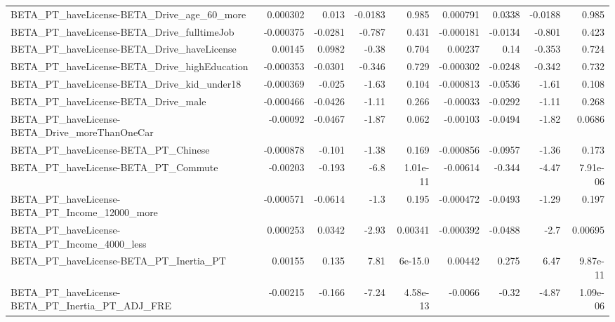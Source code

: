 \begin{tabular}{lrrrrrrrr}
BETA\_PT\_haveLicense-BETA\_Drive\_age\_60\_more         &    0.000302 &        0.013 &  -0.0183 &    0.985 &   0.000791 &      0.0338 &      -0.0188 &         0.985 \\
BETA\_PT\_haveLicense-BETA\_Drive\_fulltimeJob         &   -0.000375 &      -0.0281 &   -0.787 &    0.431 &  -0.000181 &     -0.0134 &       -0.801 &         0.423 \\
BETA\_PT\_haveLicense-BETA\_Drive\_haveLicense         &     0.00145 &       0.0982 &    -0.38 &    0.704 &    0.00237 &        0.14 &       -0.353 &         0.724 \\
BETA\_PT\_haveLicense-BETA\_Drive\_highEducation       &   -0.000353 &      -0.0301 &   -0.346 &    0.729 &  -0.000302 &     -0.0248 &       -0.342 &         0.732 \\
BETA\_PT\_haveLicense-BETA\_Drive\_kid\_under18         &   -0.000369 &       -0.025 &    -1.63 &    0.104 &  -0.000813 &     -0.0536 &        -1.61 &         0.108 \\
BETA\_PT\_haveLicense-BETA\_Drive\_male                &   -0.000466 &      -0.0426 &    -1.11 &    0.266 &   -0.00033 &     -0.0292 &        -1.11 &         0.268 \\
BETA\_PT\_haveLicense-BETA\_Drive\_moreThanOneCar      &    -0.00092 &      -0.0467 &    -1.87 &    0.062 &   -0.00103 &     -0.0494 &        -1.82 &        0.0686 \\
BETA\_PT\_haveLicense-BETA\_PT\_Chinese                &   -0.000878 &       -0.101 &    -1.38 &    0.169 &  -0.000856 &     -0.0957 &        -1.36 &         0.173 \\
BETA\_PT\_haveLicense-BETA\_PT\_Commute                &    -0.00203 &       -0.193 &     -6.8 & 1.01e-11 &   -0.00614 &      -0.344 &        -4.47 &      7.91e-06 \\
BETA\_PT\_haveLicense-BETA\_PT\_Income\_12000\_more      &   -0.000571 &      -0.0614 &     -1.3 &    0.195 &  -0.000472 &     -0.0493 &        -1.29 &         0.197 \\
BETA\_PT\_haveLicense-BETA\_PT\_Income\_4000\_less       &    0.000253 &       0.0342 &    -2.93 &  0.00341 &  -0.000392 &     -0.0488 &         -2.7 &       0.00695 \\
BETA\_PT\_haveLicense-BETA\_PT\_Inertia\_PT             &     0.00155 &        0.135 &     7.81 &  6e-15.0 &    0.00442 &       0.275 &         6.47 &      9.87e-11 \\
BETA\_PT\_haveLicense-BETA\_PT\_Inertia\_PT\_ADJ\_FRE     &    -0.00215 &       -0.166 &    -7.24 & 4.58e-13 &    -0.0066 &       -0.32 &        -4.87 &      1.09e-06 \\

\end{tabular}
